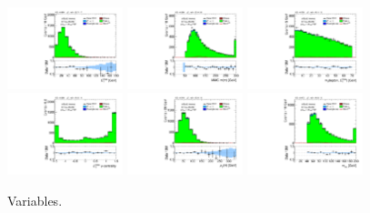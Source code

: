 \begin{figure}[!htpb]
  \includegraphics[width=0.30\textwidth]{figures/analysis/vbf-QCDCR/met-pt-hi}
  \includegraphics[width=0.30\textwidth]{figures/analysis/vbf-QCDCR/mMMC}
  \includegraphics[width=0.30\textwidth]{figures/analysis/vbf-QCDCR/mT} \\
  \includegraphics[width=0.30\textwidth]{figures/analysis/vbf-QCDCR/met-phi-centrality}
  \includegraphics[width=0.30\textwidth]{figures/analysis/vbf-QCDCR/H-pt-hi}
  \includegraphics[width=0.30\textwidth]{figures/analysis/vbf-QCDCR/mvis} \\
  \caption{Variables.}
  \label{fig:backgrounds-QCDCR-taus}
\end{figure}

